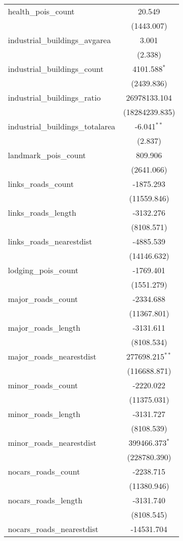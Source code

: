 \begin{table}[!htbp]
\begin{tabular}{@{\extracolsep{5pt}}lc}
 health_pois_count & 20.549$^{}$ \\
  & (1443.007) \\
 industrial_buildings_avgarea & 3.001$^{}$ \\
  & (2.338) \\
 industrial_buildings_count & 4101.588$^{*}$ \\
  & (2439.836) \\
 industrial_buildings_ratio & 26978133.104$^{}$ \\
  & (18284239.835) \\
 industrial_buildings_totalarea & -6.041$^{**}$ \\
  & (2.837) \\
 landmark_pois_count & 809.906$^{}$ \\
  & (2641.066) \\
 links_roads_count & -1875.293$^{}$ \\
  & (11559.846) \\
 links_roads_length & -3132.276$^{}$ \\
  & (8108.571) \\
 links_roads_nearestdist & -4885.539$^{}$ \\
  & (14146.632) \\
 lodging_pois_count & -1769.401$^{}$ \\
  & (1551.279) \\
 major_roads_count & -2334.688$^{}$ \\
  & (11367.801) \\
 major_roads_length & -3131.611$^{}$ \\
  & (8108.534) \\
 major_roads_nearestdist & 277698.215$^{**}$ \\
  & (116688.871) \\
 minor_roads_count & -2220.022$^{}$ \\
  & (11375.031) \\
 minor_roads_length & -3131.727$^{}$ \\
  & (8108.539) \\
 minor_roads_nearestdist & 399466.373$^{*}$ \\
  & (228780.390) \\
 nocars_roads_count & -2238.715$^{}$ \\
  & (11380.946) \\
 nocars_roads_length & -3131.740$^{}$ \\
  & (8108.545) \\
 nocars_roads_nearestdist & -14531.704$^{}$ \\

\end{tabular}
\end{table}
